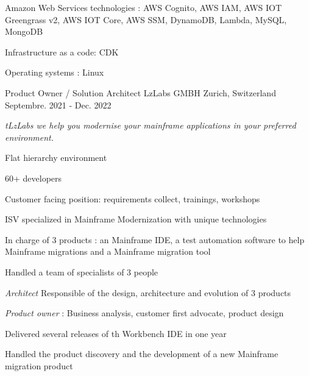 \begin{cventries}
{{\begin{cvitems}
               \end{cvitems}
            }
            {
                \begin{cvitems} %
                    \item{Amazon Web Services technologies : AWS Cognito, AWS IAM, AWS IOT Greengrass v2, AWS IOT Core, AWS SSM, DynamoDB, Lambda, MySQL, MongoDB}
		    \item{Infrastructure as a code: CDK}
		    \item{Operating systems : Linux}
                \end{cvitems}
            }            
    }%
    \cventry
    {Product Owner / Solution Architect} %
    {LzLabs GMBH} %
    {Zurich, Switzerland} %
    {Septembre. 2021 - Dec. 2022} %
    {
        \experience
            {
                \begin{cvitems} %
                    \item{\emph{tLzLabs we help you modernise your mainframe applications in your preferred environment.}}
                    \item{Flat hierarchy environment}
                    \item{60+ developers}
                    \item{Customer facing position: requirements collect, trainings, workshops }
                    \item{ISV specialized in Mainframe Modernization with unique technologies}
                    \item{In charge of 3 products : an Mainframe IDE, a test automation software to help Mainframe migrations and a Mainframe migration tool }
                    \item{Handled a team of specialists of 3 people}
                    \item {\emph{Architect} Responsible of the design, architecture and evolution of 3 products }
                    \item {\emph{Product owner} : Business analysis, customer first advocate, product design }
                    \end{cvitems}
            }
            {
               \begin{cvitems} %
                \item {Delivered several releases of th Workbench IDE in one year }
                \item {Handled the product discovery and the development of a new Mainframe migration product }

\end{cvitems}}}
\end{cventries}
